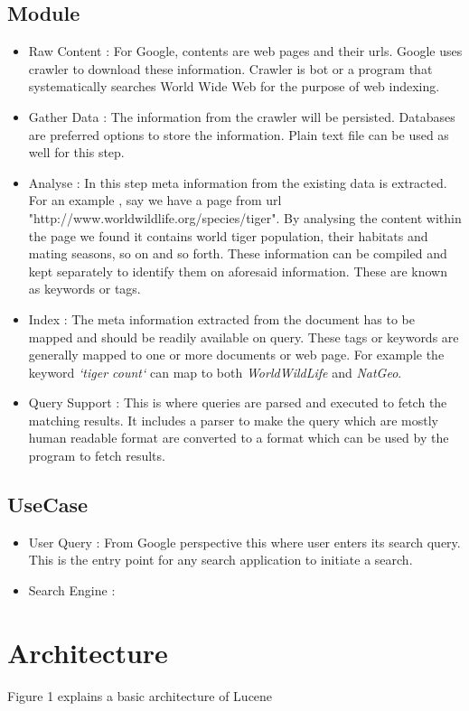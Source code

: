 \documentclass[9pt,twocolumn,twoside]{../../styles/osajnl}
\begin{document}
\subsection{Module}
\begin{itemize}
\item Raw Content : For Google, contents are web pages and their urls. Google uses crawler to download these information. Crawler is bot or a program that systematically searches World Wide Web for the purpose of web indexing.
\item Gather Data : The information from the crawler will be persisted. Databases are preferred options to store the information. Plain text file can be used as well for this step.
\item Analyse : In this step meta information from the existing data is extracted. For an example , say we have a page from url "http://www.worldwildlife.org/species/tiger". By analysing the content within the page we found it contains world tiger population, their habitats and mating seasons, so on and so forth. These information can be compiled and kept separately to identify them on aforesaid information. These are known as keywords or tags.
\item Index : The meta information extracted from the document has to be mapped and should be readily available on query. These tags or keywords are generally mapped to one or more documents or web page. For example the keyword \textit {`tiger count`} can map to both \textit{WorldWildLife} and \textit{NatGeo}. 
\item Query Support : This is where queries are parsed and executed to fetch the matching results. It includes a parser to make the query which are mostly human readable format are converted to a format which can be used by the program to fetch results.
\end{itemize}

\subsection{UseCase}
\begin{itemize}
\item User Query : From Google perspective this where user enters its search query. This is the entry point for any search application to initiate a search.
\item Search Engine :  
\end{itemize}

\section{Architecture}
Figure 1 explains a basic architecture of Lucene
\end{document}
